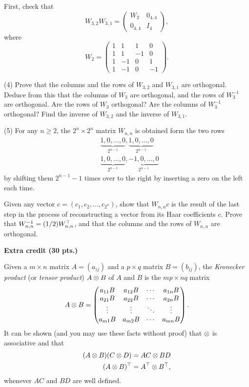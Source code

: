 \documentclass[12pt]{article}
\begin{document}
\hint
First, check that
\[
W_{3, 2}W_{3, 1} = 
\begin{pmatrix}
W_2 & 0_{4, 4} \\
0_{4, 4}         & I_4
\end{pmatrix},
\]
where
\[
W_2 = 
\begin{pmatrix}
1  &  1   &   1   &  0 \\
1  &  1   &  -1  &  0 \\
1  & -1  &   0   &  1 \\
1  & -1  &   0   & -1
\end{pmatrix}.
\]

\medskip
(4) 
Prove that the columns and the rows of $W_{3, 2}$ and $W_{3, 1}$
are orthogonal. Deduce from this that the columns of
$W_3$  are orthogonal, and the rows of $W_3^{-1}$ are orthogonal.  
Are the rows  of $W_3$ orthogonal? 
Are the columns  of $W_3^{-1}$ orthogonal? 
Find  the inverse of $W_{3, 2}$ and the inverse of $W_{3, 1}$.

\medskip
(5)
For any $n\geq 2$, the $2^n \times 2^n$ matrix $W_{n, n}$ is obtained form the
two rows
\begin{align*}
& \underbrace{1, 0, \ldots, 0}_{2^{n - 1}}, \underbrace{1, 0, \ldots,  0}_{2^{n - 1}} \\
& \underbrace{1, 0, \ldots, 0}_{2^{n - 1}}, \underbrace{-1, 0, \ldots,  0}_{2^{n - 1}} 
\end{align*}
by shifting them $2^{n - 1} - 1$ times over to the right by inserting a zero
on the left each time.

\medskip
Given any vector $c = (c_1, c_2, \ldots, c_{2^n})$, show that $W_{n, n} c$
is the result of the last step in  the
process of reconstructing a vector from its Haar coefficients $c$.
Prove that $W_{n, n}^{-1} = (1/2)W_{n, n}^{\top}$, and that the
columns and the rows
of $W_{n, n}$ are orthogonal.


\medskip
{\bf Extra credit (30 pts.)}

\medskip
Given a $m\times n$ matrix $A = (a_{i j})$ and a $p\times q$ matrix
$B = (b_{i j})$, the {\it Kronecker product\/} (or {\it tensor
  product\/}) $A\otimes B$ of $A$ and $B$ is the $mp\times nq$ matrix
\[
A\otimes B =
\begin{pmatrix}
a_{1 1} B & a_{1 2} B & \cdots & a_{1 n} B \\
a_{2 1} B & a_{2 2} B & \cdots & a_{2 n} B \\
\vdots  & \vdots & \ddots & \vdots \\
a_{m 1} B & a_{m 2} B & \cdots & a_{m n} B 
\end{pmatrix} .
\]
It can be shown (and you may use these facts without proof) that
$\otimes$ is associative and that
\begin{align*}
(A\otimes B)(C\otimes D) & = AC \otimes BD \\
(A\otimes B)^{\top} & = A^{\top} \otimes B^{\top}, 
\end{align*}
whenever $AC$ and $BD$ are well defined.
\end{document}
